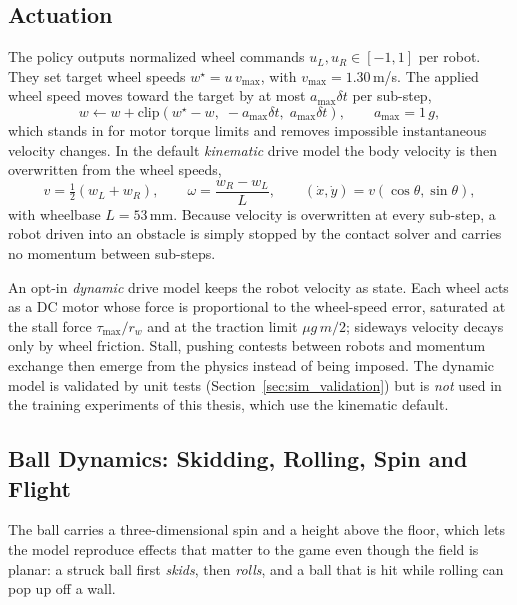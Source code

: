\subsection{Actuation}

The policy outputs normalized wheel commands $u_L,u_R\in[-1,1]$ per robot.  They
set target wheel speeds $w^\star = u\,v_{\max}$, with
$v_{\max} = 1.30$\,m/s.  The applied wheel speed moves toward the target by at
most $a_{\max}\delta t$ per sub-step,
\begin{equation}
    w \leftarrow w + \mathrm{clip}\!\left(w^\star - w,\; -a_{\max}\delta t,\; a_{\max}\delta t\right),
    \qquad a_{\max} = 1\,g,
\end{equation}
which stands in for motor torque limits and removes impossible instantaneous
velocity changes.  In the default \emph{kinematic} drive model the body velocity is then
overwritten from the wheel speeds,
\begin{equation}
    v = \tfrac12 (w_L + w_R), \qquad
    \omega = \frac{w_R - w_L}{L}, \qquad
    (\dot x,\dot y) = v(\cos\theta,\sin\theta),
\end{equation}
with wheelbase $L = 53$\,mm.  Because velocity is overwritten at every sub-step,
a robot driven into an obstacle is simply stopped by the contact solver and
carries no momentum between sub-steps.

An opt-in \emph{dynamic} drive model keeps the robot velocity as state.  Each
wheel acts as a DC motor whose force is proportional to the wheel-speed error,
saturated at the stall force $\tau_{\max}/r_w$ and at the traction limit
$\mu g\,m/2$; sideways velocity decays only by wheel friction.  Stall, pushing
contests between robots and momentum exchange then emerge from the physics
instead of being imposed.  The dynamic model is validated by unit tests
(Section~\ref{sec:sim_validation}) but is \emph{not} used in the training
experiments of this thesis, which use the kinematic default.  %

\subsection{Ball Dynamics: Skidding, Rolling, Spin and Flight}

The ball carries a three-dimensional spin and a height above the floor, which
lets the model reproduce effects that matter to the game even though the field is
planar: a struck ball first \emph{skids}, then \emph{rolls}, and a ball that
is hit while rolling can pop up off a wall.

